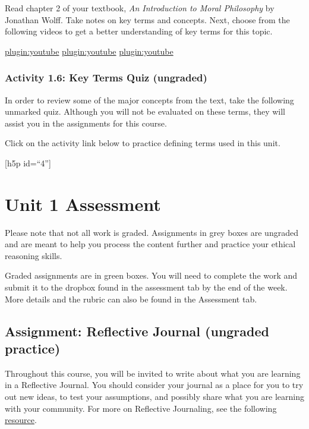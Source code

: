 \documentclass[
]{book}
\begin{document}
Read chapter 2 of your textbook, \emph{An Introduction to Moral Philosophy} by
Jonathan Wolff. Take notes on key terms and concepts.
Next, choose from the following videos to get a better understanding of key
terms for this topic.

\href{https://www.youtube.com/watch?v=Z11v2nWsgGA}{plugin:youtube}
\href{https://www.youtube.com/watch?v=DxhsYTlBNG8}{plugin:youtube}
\href{https://www.youtube.com/watch?v=asery3UeBj4}{plugin:youtube}

\hypertarget{activity-1.6-key-terms-quiz-ungraded}{%
\subsubsection{Activity 1.6: Key Terms Quiz (ungraded)}\label{activity-1.6-key-terms-quiz-ungraded}}

In order to review some of the major concepts from the text, take the following unmarked quiz. Although you will not be evaluated on these terms, they will assist you in the assignments for this course.

Click on the activity link below to practice defining terms used in this unit.

{[}h5p id=``4''{]}

\hypertarget{unit-1-assessment}{%
\section{Unit 1 Assessment}\label{unit-1-assessment}}

Please note that not all work is graded. Assignments in grey boxes are ungraded and are meant to help you process the content further and practice your ethical reasoning skills.

Graded assignments are in green boxes. You will need to complete the work and submit it to the dropbox found in the assessment tab by the end of the week. More details and the rubric can also be found in the Assessment tab.

\hypertarget{assignment-reflective-journal-ungraded-practice}{%
\subsection{Assignment: Reflective Journal (ungraded practice)}\label{assignment-reflective-journal-ungraded-practice}}

Throughout this course, you will be invited to write about what you are learning
in a Reflective Journal. You should consider your journal as a place for you to
try out new ideas, to test your assumptions, and possibly share what you are
learning with your community. For more on Reflective Journaling, see the
following \href{Reflective_Journaling.pdf}{resource}.
\end{document}
